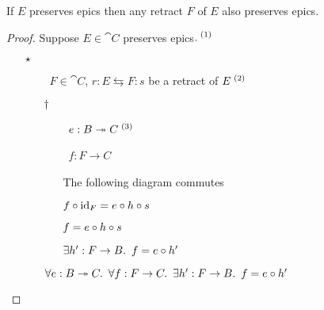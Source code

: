 \begin{prop}
  If $E$ preserves epics then any retract $F$ of $E$ also preserves epics.

  \begin{proof}
    Suppose $E\in\cat{C}$ preserves epics$.^{\text~(1)}$

    \begin{itemize}
      \item[$\star$]
        \begin{itemize}
          \item[\phs]
            \Let~$F \in \cat{C}$, $r : E \leftrightarrows F : s$ be a retract of $E^{\text~(2)}$
            \marginnote{\Hyp}

          \item[$\dagger$]
            \begin{itemize}
              \item[\phs]
                \Let~$e : B \twoheadrightarrow C^{\text~(3)}$
                \marginnote{\Hyp}

              \item[\phs]
                \Let~$f : F \to C$
                \marginnote{\Hyp}

              \item[\imps]
                The following diagram commutes
                \begin{center}
                \end{center}

              \item[\imps] $f\circ\operatorname{id}_F = e\circ h\circ s$

              \item[\imps] $f = e\circ h\circ s$
                \marginnote{\Def-$\id$}

              \item[\imps] $\exists h^\prime : F\to B\ldotp~f = e\circ h^\prime$
                \marginnote{$\exists$-\Intro}
            \end{itemize}
            \item[\imps]
              $\forall e : B \twoheadrightarrow C\ldotp~\forall f : F \to C\ldotp~\exists h^\prime : F\to B\ldotp~f = e\circ h^\prime$
              \marginnote{$\forall$-\Intro-$\dagger$}


\end{itemize}
\end{itemize}
\end{proof}
\end{prop}
